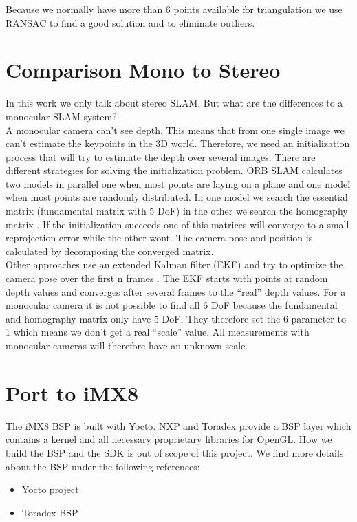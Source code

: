 \documentclass[11pt,a4paper,titlepage,oneside]{report}
\begin{document}
Because we normally have more than 6 points available for triangulation we use RANSAC \cite{ransac} to find a good solution and to eliminate outliers.

\section{Comparison Mono to Stereo}\label{sec:monster}

In this work we only talk about stereo SLAM. But what are the differences to a monocular SLAM system?\\
A monocular camera can't see depth. This means that from one single image we can't estimate the keypoints in the 3D world. Therefore, we need an initialization process that will try to estimate the depth over several images. There are different strategies for solving the initialization problem. ORB SLAM calculates two models in parallel one when most points are laying on a plane and one model when most points are randomly distributed. In one model we search the essential matrix (fundamental matrix with 5 DoF) in the other we search the homography matrix \cite{orbslam}. If the initialization succeeds one of this matrices will converge to a small reprojection error while the other wont. The camera pose and position is calculated by decomposing the converged matrix.\\
Other approaches use an extended Kalman filter (EKF) and try to optimize the camera pose over the first n frames \cite{svo}. The EKF starts with points at random depth values and converges after several frames to the ``real'' depth values. For a monocular camera it is not possible to find all 6 DoF because the fundamental and homography matrix only have 5 DoF. They therefore set the 6 parameter to 1 which means we don't get a real ``scale'' value. All measurements with monocular cameras will therefore have an unknown scale.

\section{Port to iMX8}\label{sec:orbport}

The iMX8 BSP is built with Yocto. NXP and Toradex provide a BSP layer which contains a kernel and all necessary proprietary libraries for OpenGL. How we build the BSP and the SDK is out of scope of this project. We find more details about the BSP under the following references:
\begin{itemize}
	\item Yocto project \cite{yocto}
	\item Toradex BSP \cite{toradex_bsp}
\end{itemize}
\end{document}
